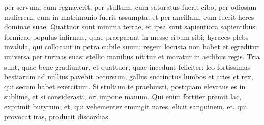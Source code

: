 \begin{biblechapter}
\begin{biblechapter}
\begin{biblechapter}
\begin{biblechapter}
\begin{biblechapter}
\begin{biblechapter}
\begin{biblechapter}
\begin{biblechapter}
\begin{biblechapter}
\begin{biblechapter}
\begin{biblechapter}
\begin{biblechapter}
\begin{biblechapter}
\begin{biblechapter}
\begin{biblechapter}
\begin{biblechapter}
\begin{biblechapter}
\begin{biblechapter}
\begin{biblechapter}
\begin{biblechapter}
\begin{biblechapter}
\begin{biblechapter}
\begin{biblechapter}
\begin{biblechapter}
\begin{biblechapter}
\begin{biblechapter}
\begin{biblechapter}
\begin{biblechapter}
\begin{biblechapter}
\begin{biblechapter}
 \verse per servum, cum regnaverit,
 per stultum, cum saturatus fuerit cibo,
 \verse per odiosam mulierem, cum in matrimonio fuerit assumpta,
 et per ancillam, cum fuerit heres dominae suae.
 \verse Quattuor sunt minima terrae,
 et ipsa sunt sapientiora sapientibus:
 \verse formicae populus infirmus,
 quae praeparant in messe cibum sibi;
 \verse hyraces plebs invalida,
 qui collocant in petra cubile suum;
 \verse regem locusta non habet
 et egreditur universa per turmas suas;
 \verse stellio manibus nititur
 et moratur in aedibus regis.
 \verse Tria sunt, quae bene gradiuntur,
 et quattuor, quae incedunt feliciter:
 \verse leo fortissimus bestiarum
 ad nullius pavebit occursum,
 \verse gallus succinctus lumbos et aries
 et rex, qui secum habet exercitum.
 \verse Si stultum te praebuisti, postquam elevatus es in sublime,
 et si considerasti, ori impone manum.
 \verse Qui enim fortiter premit lac, exprimit butyrum,
 et, qui vehementer emungit nares, elicit sanguinem,
 et, qui provocat iras, producit discordias.
 

\end{biblechapter}
\end{biblechapter}
\end{biblechapter}
\end{biblechapter}
\end{biblechapter}
\end{biblechapter}
\end{biblechapter}
\end{biblechapter}
\end{biblechapter}
\end{biblechapter}
\end{biblechapter}
\end{biblechapter}
\end{biblechapter}
\end{biblechapter}
\end{biblechapter}
\end{biblechapter}
\end{biblechapter}
\end{biblechapter}
\end{biblechapter}
\end{biblechapter}
\end{biblechapter}
\end{biblechapter}
\end{biblechapter}
\end{biblechapter}
\end{biblechapter}
\end{biblechapter}
\end{biblechapter}
\end{biblechapter}
\end{biblechapter}
\end{biblechapter}
